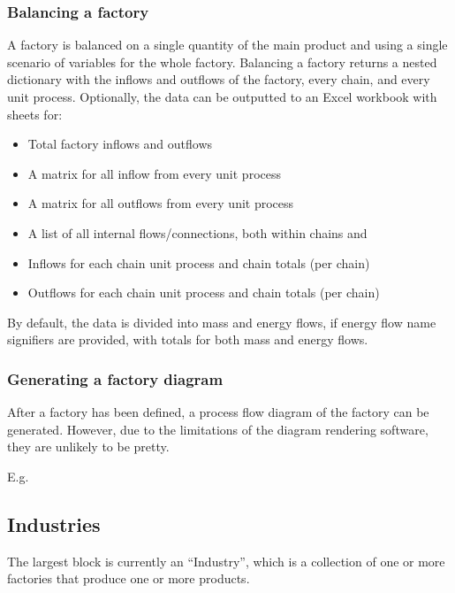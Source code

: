 \documentclass[a4paper,10pt,english]{sphinxmanual}
\begin{document}
\subsubsection{Balancing a factory}
\label{\detokenize{intro:balancing-a-factory}}
A factory is balanced on a single quantity of the main product and using a single scenario of variables for the whole factory. Balancing a factory returns a nested dictionary with the inflows and outflows of the factory, every chain, and every unit process. Optionally, the data can be outputted to an Excel workbook with sheets for:
\begin{itemize}
\item {} 
Total factory inflows and outflows

\item {} 
A matrix for all inflow from every unit process

\item {} 
A matrix for all outflows from every unit process

\item {} 
A list of all internal flows/connections, both within chains and

\item {} 
Inflows for each chain unit process and chain totals (per chain)

\item {} 
Outflows for each chain unit process and chain totals (per chain)

\end{itemize}

By default, the data is divided into mass and energy flows, if energy flow name signifiers are provided, with totals for both mass and energy flows.


\subsubsection{Generating a factory diagram}
\label{\detokenize{intro:generating-a-factory-diagram}}
After a factory has been defined, a process flow diagram of the factory can be generated. However, due to the limitations of the diagram rendering software, they are unlikely to be pretty.

E.g.


\subsection{Industries}
\label{\detokenize{intro:industries}}
The largest block is currently an “Industry”, which is a collection of one or more factories that produce one or more products.
\end{document}
